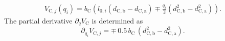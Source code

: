 \begin{equation}
\begin{split}
     V_{\mathrm{C},j}(q_i) = b_\mathrm{C} \left ( l_{0,i} ( d_{\mathrm{C},\mathrm{b}}-d_{\mathrm{C},\mathrm{a}}) \mp \frac{q_i}{2} (d_{\mathrm{C},\mathrm{b}}^2 - d_{\mathrm{C},\mathrm{a}}^2) \right ).
\end{split}
\end{equation}
The partial derivative $\partial_{q} V_{\mathrm{C}}$ is determined as
\begin{equation}
    \partial_{q_i} V_{\mathrm{C},j} = \mp \, 0.5 \, b_\mathrm{C} \, (d_{\mathrm{C},\mathrm{b}}^2-d_{\mathrm{C},\mathrm{a}}^2).
\end{equation}

